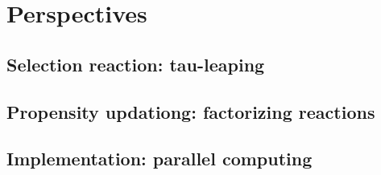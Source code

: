 \section {Perspectives}

\subsection {Selection reaction: tau-leaping}

\subsection {Propensity updationg: factorizing reactions}

\subsection {Implementation: parallel computing}
